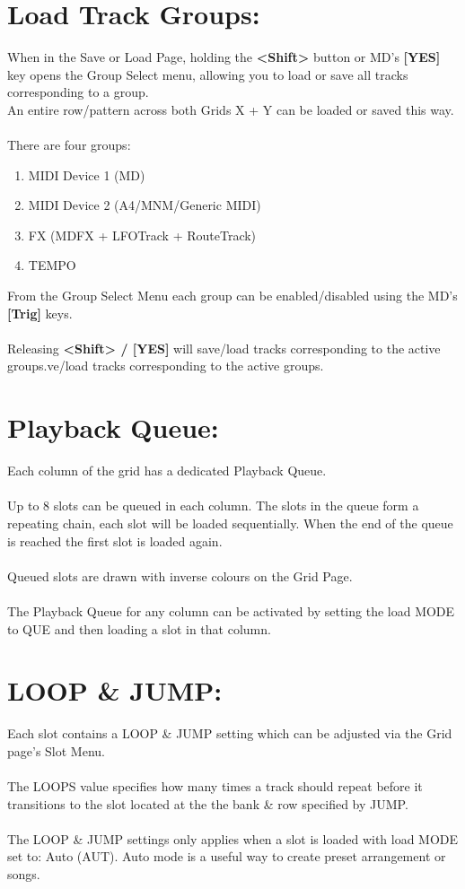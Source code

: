 \section{Load Track Groups:}
When in the Save or Load Page, holding the \textbf{<Shift>} button or MD's \textbf{[YES]} key opens the Group Select menu,
allowing you to load or save all tracks corresponding to a group.\\An entire row/pattern across both Grids X + Y can be loaded or saved this way.\\
\\
There are four groups:
\begin{enumerate}
    \item MIDI Device 1 (MD)
    \item MIDI Device 2 (A4/MNM/Generic MIDI)
    \item FX (MDFX + LFOTrack + RouteTrack)
    \item TEMPO
\end{enumerate}
From the Group Select Menu each group can be enabled/disabled using the MD's \textbf{[Trig]} keys.\\
\\
Releasing \textbf{<Shift> / [YES]} will save/load tracks corresponding to the active groups.ve/load tracks corresponding to the active groups.
\newpage

\section{Playback Queue:}
Each column of the grid has a dedicated Playback Queue.\\\\Up to 8 slots can be queued in each column.  The slots in the queue form a repeating chain, each slot will be loaded sequentially. When the end of the queue is reached the first slot is loaded again.\\\\Queued slots are drawn with inverse colours on the Grid Page.\\\\The Playback Queue for any column can be activated by setting the load MODE to QUE and then loading a slot in that column.

\section{LOOP \& JUMP:}
Each slot contains a LOOP \& JUMP setting which can be adjusted via the Grid page's Slot Menu.\\\\The LOOPS value specifies how many times a track should repeat before it transitions to the slot located at the the bank \& row specified by JUMP.
\\\\The LOOP \& JUMP settings only applies when a slot is loaded with load MODE set to: Auto (AUT). Auto mode is a useful way to create preset arrangement or songs.

